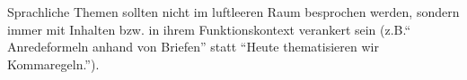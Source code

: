 Sprachliche Themen sollten nicht im luftleeren Raum besprochen werden, sondern immer mit Inhalten bzw. in ihrem Funktionskontext verankert sein (z.B.`` Anredeformeln anhand von Briefen'' statt ``Heute thematisieren wir Kommaregeln.'').